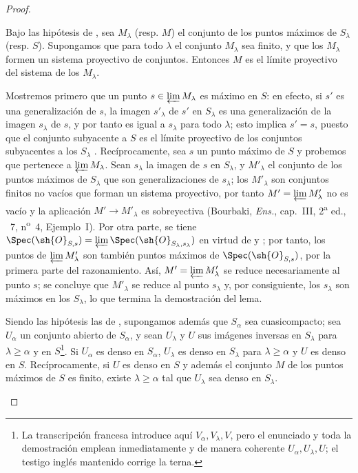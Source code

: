 \begin{proof}
\begin{lemma}[20.3.8.3]
\label{IV.20.3.8.3}
Bajo las hipótesis de , sea $M_\lambda$ \textup{(resp. $M$)} el conjunto de los puntos máximos de $S_\lambda$ \textup{(resp. $S$)}.
Supongamos que para todo $\lambda$ el conjunto $M_\lambda$ sea finito, y que los $M_\lambda$ formen un sistema proyectivo de conjuntos.
Entonces $M$ es el límite proyectivo del sistema de los $M_\lambda$.
\end{lemma}

Mostremos primero que un punto $s\in\varprojlim M_\lambda$ es máximo en $S$: en efecto, si $s'$ es una generalización de $s$, la imagen $s'_\lambda$ de $s'$ en $S_\lambda$ es una generalización de la imagen $s_\lambda$ de $s$, y por tanto es igual a $s_\lambda$ para todo $\lambda$; esto implica $s'=s$, puesto que el conjunto subyacente a $S$ es el límite proyectivo de los conjuntos subyacentes a los $S_\lambda$ .
Recíprocamente, sea $s$ un punto máximo de $S$ y probemos que pertenece a $\varprojlim M_\lambda$.
Sean $s_\lambda$ la imagen de $s$ en $S_\lambda$, y $M'_\lambda$ el conjunto de los puntos máximos de $S_\lambda$ que son generalizaciones de $s_\lambda$; los $M'_\lambda$ son conjuntos finitos no vacíos que forman un sistema proyectivo, por tanto $M'=\varprojlim M'_\lambda$ no es vacío y la aplicación $M'\to M'_\lambda$ es sobreyectiva (Bourbaki, \emph{Ens.}, cap.~III, 2\textsuperscript{a} ed., \textsection~7, n\textsuperscript{o}~4, Ejemplo~I).
Por otra parte, se tiene $\Spec(\sh{O}_{S,s})=\varprojlim\Spec(\sh{O}_{S_\lambda,s_\lambda})$ en virtud de  y ; por tanto, los puntos de $\varprojlim M'_\lambda$ son también puntos máximos de $\Spec(\sh{O}_{S,s})$, por la primera parte del razonamiento.
Así, $M'=\varprojlim M'_\lambda$ se reduce necesariamente al punto $s$; se concluye que $M'_\lambda$ se reduce al punto $s_\lambda$ y, por consiguiente, los $s_\lambda$ son máximos en los $S_\lambda$, lo que termina la demostración del lema.

\begin{lemma}[20.3.8.4]
\label{IV.20.3.8.4}
Siendo las hipótesis las de , supongamos además que $S_\alpha$ sea cuasicompacto; sea $U_\alpha$ un conjunto abierto de $S_\alpha$, y sean $U_\lambda$ y $U$ sus imágenes inversas en $S_\lambda$ para $\lambda\geq\alpha$ y en $S$\footnote{La transcripción francesa introduce aquí $V_\alpha,V_\lambda,V$, pero el enunciado y toda la demostración emplean inmediatamente y de manera coherente $U_\alpha,U_\lambda,U$; el testigo inglés mantenido corrige la terna.}.
Si $U_\alpha$ es denso en $S_\alpha$, $U_\lambda$ es denso en $S_\lambda$ para $\lambda\geq\alpha$ y $U$ es denso en $S$.
Recíprocamente, si $U$ es denso en $S$ y además el conjunto $M$ de los puntos máximos de $S$ es finito, existe $\lambda\geq\alpha$ tal que $U_\lambda$ sea denso en $S_\lambda$.
\end{lemma}


\end{proof}
